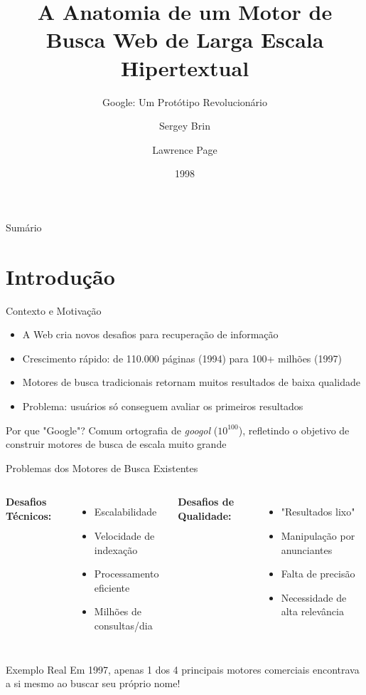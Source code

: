 \documentclass[aspectratio=169]{beamer}
\title[Anatomia do Google]{A Anatomia de um Motor de Busca Web de Larga Escala Hipertextual}
\subtitle{Google: Um Protótipo Revolucionário}
\author{Sergey Brin \and Lawrence Page}
\institute{Departamento de Ciência da Computação\\Stanford University}
\date{1998}
\begin{document}
\frame{\titlepage}

\begin{frame}{Sumário}
\tableofcontents
\end{frame}

\section{Introdução}

\begin{frame}{Contexto e Motivação}
\begin{itemize}
\item A Web cria novos desafios para recuperação de informação
\item Crescimento rápido: de 110.000 páginas (1994) para 100+ milhões (1997)
\item Motores de busca tradicionais retornam muitos resultados de baixa qualidade
\item Problema: usuários só conseguem avaliar os primeiros resultados
\end{itemize}

\vspace{0.5cm}
\begin{block}{Por que "Google"?}
Comum ortografia de \textit{googol} ($10^{100}$), refletindo o objetivo de construir motores de busca de escala muito grande
\end{block}
\end{frame}

\begin{frame}{Problemas dos Motores de Busca Existentes}
\begin{columns}
\textbf{Desafios Técnicos:}
\begin{itemize}
\item Escalabilidade
\item Velocidade de indexação
\item Processamento eficiente
\item Milhões de consultas/dia
\end{itemize}

\textbf{Desafios de Qualidade:}
\begin{itemize}
\item "Resultados lixo"
\item Manipulação por anunciantes
\item Falta de precisão
\item Necessidade de alta relevância
\end{itemize}
\end{columns}

\vspace{0.5cm}
\begin{alertblock}{Exemplo Real}
Em 1997, apenas 1 dos 4 principais motores comerciais encontrava a si mesmo ao buscar seu próprio nome!
\end{alertblock}
\end{frame}
\end{document}
